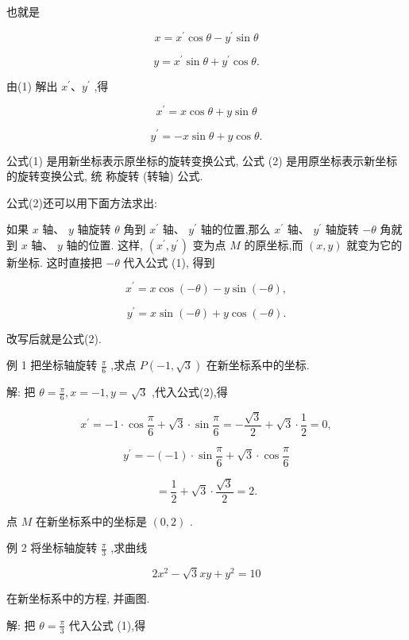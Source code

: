 \documentclass[lang=cn,newtx,10pt,scheme=chinese]{elegantbook}
\begin{document}
也就是

\[
  x = {x}^{\prime }\cos \theta - {y}^{\prime }\sin \theta \tag{1}
\]

\[
  y = {x}^{\prime }\sin \theta + {y}^{\prime }\cos \theta .
\]

由(1) 解出 \({x}^{\prime }\text{、}{y}^{\prime }\) ,得

\[
    {x}^{\prime } = x\cos \theta + y\sin \theta \tag{2}
\]

\[
    {y}^{\prime } = - x\sin \theta + y\cos \theta .
\]

公式(1) 是用新坐标表示原坐标的旋转变换公式, 公式 (2) 是用原坐标表示新坐标的旋转变换公式, 统 称旋转 (转轴) 公式.

公式(2)还可以用下面方法求出:

如果 \(x\) 轴、 \(y\) 轴旋转 \(\theta\) 角到 \({x}^{\prime }\) 轴、 \({y}^{\prime }\) 轴的位置,那么 \({x}^{\prime }\) 轴、 \({y}^{\prime }\) 轴旋转 \(- \theta\) 角就到 \(x\) 轴、 \(y\) 轴的位置. 这样, \(\left( {{x}^{\prime },{y}^{\prime }}\right)\) 变为点 \(M\) 的原坐标,而 \(\left( {x,y}\right)\) 就变为它的新坐标. 这时直接把 \(- \theta\) 代入公式 (1), 得到

\[
    {x}^{\prime } = x\cos \left( {-\theta }\right) - y\sin \left( {-\theta }\right) ,
\]

\[
    {y}^{\prime } = x\sin \left( {-\theta }\right) + y\cos \left( {-\theta }\right) .
\]

改写后就是公式(2).

例 1 把坐标轴旋转 \(\frac{\pi }{6}\) ,求点 \(P\left( {-1,\sqrt{3}}\right)\) 在新坐标系中的坐标.

解: 把 \(\theta = \frac{\pi }{6},x = - 1,y = \sqrt{3}\) ,代入公式(2),得

\[
    {x}^{\prime } = - 1 \cdot \cos \frac{\pi }{6} + \sqrt{3} \cdot \sin \frac{\pi }{6} = - \frac{\sqrt{3}}{2} + \sqrt{3} \cdot \frac{1}{2} = 0,
\]

\[
    {y}^{\prime } = - \left( {-1}\right) \cdot \sin \frac{\pi }{6} + \sqrt{3} \cdot \cos \frac{\pi }{6}
\]

\[
  = \frac{1}{2} + \sqrt{3} \cdot \frac{\sqrt{3}}{2} = 2\text{.}
\]

点 \(M\) 在新坐标系中的坐标是 \(\left( {0,2}\right)\) .

例 2 将坐标轴旋转 \(\frac{\pi }{3}\) ,求曲线

\[
  2{x}^{2} - \sqrt{3}{xy} + {y}^{2} = {10}
\]

在新坐标系中的方程, 并画图.

解: 把 \(\theta = \frac{\pi }{3}\) 代入公式 (1),得
\end{document}
